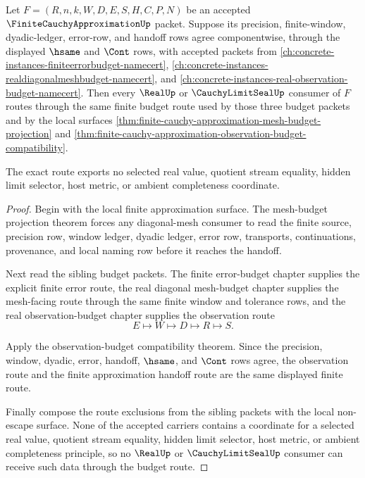 \begin{theorem}
\label{thm:finite-cauchy-approximation-budget-route-exactness}
Let $F=(R,n,k,W,D,E,S,H,C,P,N)$ be an accepted $\FiniteCauchyApproximationUp$ packet. Suppose its precision, finite-window, dyadic-ledger, error-row, and handoff rows agree componentwise, through the displayed $\hsame$ and $\Cont$ rows, with accepted packets from \autoref{ch:concrete-instances-finiteerrorbudget-namecert}, \autoref{ch:concrete-instances-realdiagonalmeshbudget-namecert}, and \autoref{ch:concrete-instances-real-observation-budget-namecert}. Then every $\RealUp$ or $\CauchyLimitSealUp$ consumer of $F$ routes through the same finite budget route used by those three budget packets and by the local surfaces \autoref{thm:finite-cauchy-approximation-mesh-budget-projection} and \autoref{thm:finite-cauchy-approximation-observation-budget-compatibility}.

The exact route exports no selected real value, quotient stream equality, hidden limit selector, host metric, or ambient completeness coordinate.
\end{theorem}
\begin{proof}
Begin with the local finite approximation surface. The mesh-budget projection theorem forces any diagonal-mesh consumer to read the finite source, precision row, window ledger, dyadic ledger, error row, transports, continuations, provenance, and local naming row before it reaches the handoff.

Next read the sibling budget packets. The finite error-budget chapter supplies the explicit finite error route, the real diagonal mesh-budget chapter supplies the mesh-facing route through the same finite window and tolerance rows, and the real observation-budget chapter supplies the observation route
$$
E \longmapsto W \longmapsto D \longmapsto R \longmapsto S.
$$

Apply the observation-budget compatibility theorem. Since the precision, window, dyadic, error, handoff, $\hsame$, and $\Cont$ rows agree, the observation route and the finite approximation handoff route are the same displayed finite route.

Finally compose the route exclusions from the sibling packets with the local non-escape surface. None of the accepted carriers contains a coordinate for a selected real value, quotient stream equality, hidden limit selector, host metric, or ambient completeness principle, so no $\RealUp$ or $\CauchyLimitSealUp$ consumer can receive such data through the budget route.
\end{proof}

